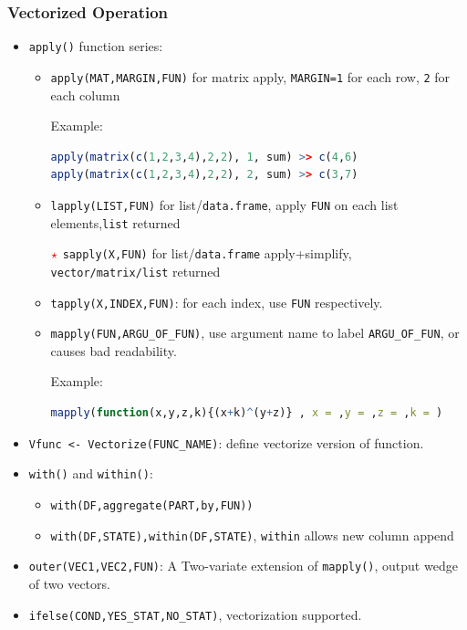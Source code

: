 \subsubsection{Vectorized Operation}\label{SubSubSectionVectorizedOperation}
\begin{itemize}[topsep=2pt,itemsep=0pt]
    \item \lstinline|apply()| function series:
\begin{itemize}[topsep=2pt,itemsep=0pt]
    \item \lstinline|apply(MAT,MARGIN,FUN)| for matrix apply, \lstinline|MARGIN=1| for each row, \lstinline|2| for each column
    
Example:
\begin{lstlisting}[language=R]
apply(matrix(c(1,2,3,4),2,2), 1, sum) >> c(4,6)
apply(matrix(c(1,2,3,4),2,2), 2, sum) >> c(3,7)
\end{lstlisting}
    \item \lstinline|lapply(LIST,FUN)| for list/\lstinline|data.frame|, apply \lstinline|FUN| on each list elements,\lstinline|list| returned
    \item[$ \color{red}\star $] \lstinline|sapply(X,FUN)| for list/\lstinline|data.frame| apply+simplify, \lstinline|vector/matrix/list| returned
    \item \lstinline|tapply(X,INDEX,FUN)|: for each index, use \lstinline|FUN| respectively.
    \item \lstinline|mapply(FUN,ARGU_OF_FUN)|, use argument name to label \lstinline|ARGU_OF_FUN|, or causes bad readability. 
    
    Example:
\begin{lstlisting}[language=R]
mapply(function(x,y,z,k){(x+k)^(y+z)} , x = ,y = ,z = ,k = )
\end{lstlisting}
    \end{itemize}

    \item \lstinline|Vfunc <- Vectorize(FUNC_NAME)|: define vectorize version of function.
    \item \lstinline|with()| and \lstinline|within()|:
    \begin{itemize}[topsep=2pt,itemsep=0pt]
         \item \lstinline|with(DF,aggregate(PART,by,FUN))|
        \item \lstinline|with(DF,STATE),within(DF,STATE)|,
     \lstinline|within| allows new column append
    \end{itemize}
    \item \lstinline|outer(VEC1,VEC2,FUN)|: A Two-variate extension of \lstinline|mapply()|, output wedge of two vectors.
    \item \lstinline|ifelse(COND,YES_STAT,NO_STAT)|, vectorization supported.
\end{itemize}





